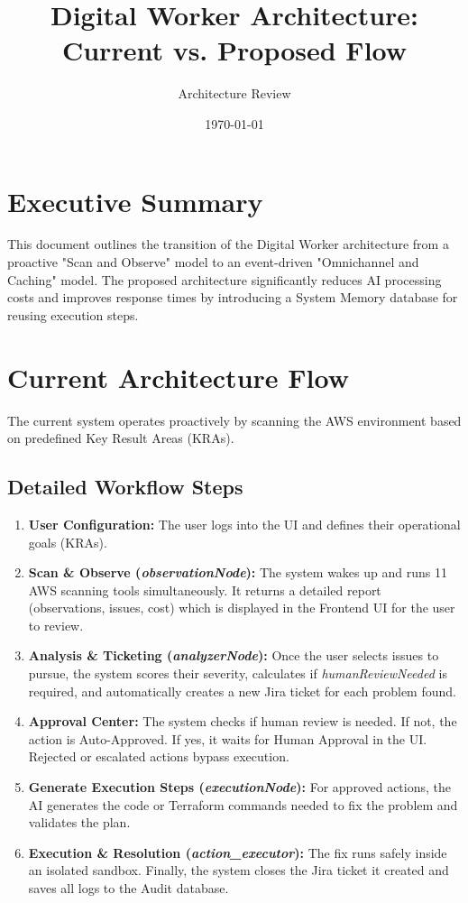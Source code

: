 \documentclass[12pt,a4paper]{article}
\title{\textbf{Digital Worker Architecture: Current vs. Proposed Flow}}
\author{Architecture Review}
\date{\today}
\begin{document}
\maketitle

\section*{Executive Summary}
This document outlines the transition of the Digital Worker architecture from a proactive "Scan and Observe" model to an event-driven "Omnichannel and Caching" model. The proposed architecture significantly reduces AI processing costs and improves response times by introducing a System Memory database for reusing execution steps.

\newpage
\section{Current Architecture Flow}
The current system operates proactively by scanning the AWS environment based on predefined Key Result Areas (KRAs).

\subsection*{Detailed Workflow Steps}
\begin{enumerate}[label=\textbf{\arabic*.}]
    \item \textbf{User Configuration:} The user logs into the UI and defines their operational goals (KRAs).
    \item \textbf{Scan \& Observe (\textit{observationNode}):} The system wakes up and runs 11 AWS scanning tools simultaneously. It returns a detailed report (observations, issues, cost) which is displayed in the Frontend UI for the user to review.
    \item \textbf{Analysis \& Ticketing (\textit{analyzerNode}):} Once the user selects issues to pursue, the system scores their severity, calculates if \textit{humanReviewNeeded} is required, and automatically creates a new Jira ticket for each problem found.
    \item \textbf{Approval Center:} The system checks if human review is needed. If not, the action is Auto-Approved. If yes, it waits for Human Approval in the UI. Rejected or escalated actions bypass execution.
    \item \textbf{Generate Execution Steps (\textit{executionNode}):} For approved actions, the AI generates the code or Terraform commands needed to fix the problem and validates the plan.
    \item \textbf{Execution \& Resolution (\textit{action\_executor}):} The fix runs safely inside an isolated sandbox. Finally, the system closes the Jira ticket it created and saves all logs to the Audit database.
\end{enumerate}
\end{document}
